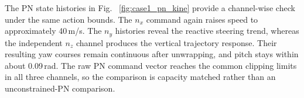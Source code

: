 \documentclass[lettersize,journal]{IEEEtran}
\providecommand{\DIFadd}[1]{{\protect\color{blue} #1}} %
\providecommand{\DIFdel}[1]{} %
\providecommand{\DIFaddbegin}{} %
\providecommand{\DIFaddend}{} %
\providecommand{\DIFdelbegin}{} %
\providecommand{\DIFdelend}{} %
\begin{document}
\DIFdelbegin \DIFdel{Beyond individual interception capabilities, a core requirement of swarm defense is the execution of a simultaneous saturation strike to prevent the targets from defeating the interceptors piecemeal. This vital temporal coordination is dynamically achieved during the flight, as evidenced by the time-to-go ($t_{go}$) profiles }\DIFdelend \DIFaddbegin \DIFadd{The PN state histories }\DIFaddend in Fig.~\DIFdelbegin \DIFdel{\ref{fig:case1_mappo_tgo}. The $t_{go}$ curves of interceptors assigned to
the same target rapidly converge as the engagement progresses. This explicitly demonstrates that ART-MAPPO actively shapes the velocity distribution of the swarm to synchronize the remaining flight times long before the actual impact}\DIFdelend \DIFaddbegin \DIFadd{\ref{fig:case1_pn_kine} provide a channel-wise
check under the same action bounds. The \(n_x\) command again raises speed to
approximately 40\,m/s. The \(n_y\) histories reveal the reactive steering
trend, whereas the independent \(n_z\) channel produces the vertical
trajectory response. Their resulting yaw courses remain continuous after
unwrapping, and pitch stays within about 0.09\,rad. The raw PN command vector
reaches the common clipping limits in all three channels, so the comparison is
capacity matched rather than an unconstrained-PN comparison}\DIFaddend .
\end{document}

